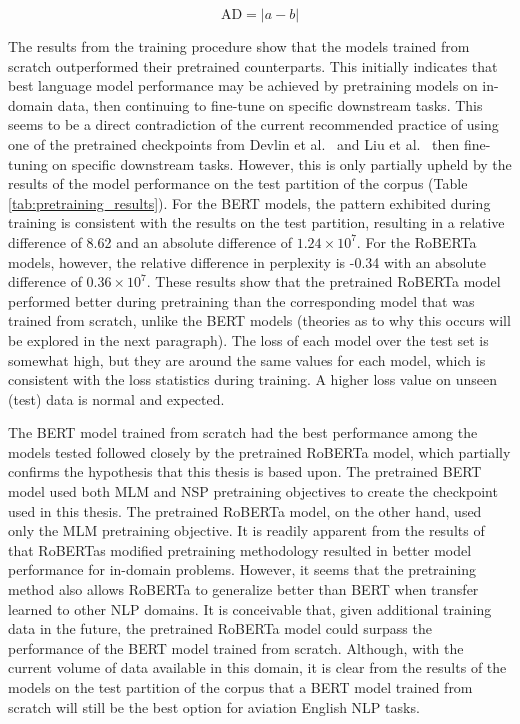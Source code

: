 \documentclass[12pt]{article}
\begin{document}
\begin{equation}\label{eq:absolute_difference}
    \mbox{AD} = |a - b|
\end{equation}

The results from the training procedure show that the models trained from scratch outperformed their pretrained counterparts. This initially
indicates that best language model performance may be achieved by pretraining models on in-domain data, then continuing to fine-tune on specific
downstream tasks. This seems to be a direct contradiction of the current recommended practice of using one of the pretrained checkpoints from Devlin
et al.~\cite{devlin_bert_2019} and Liu et al.~\cite{liu_roberta_2019} then fine-tuning on specific downstream tasks. However, this is only partially
upheld by the results of the model performance on the test partition of the corpus (Table \ref{tab:pretraining_results}). For the BERT models, the
pattern exhibited during training is consistent with the results on the test partition, resulting in a relative difference of 8.62 and an absolute
difference of $1.24 \times 10^7$. For the RoBERTa models, however, the relative difference in perplexity is -0.34 with an absolute difference of
$0.36 \times 10^7$. These results show that the pretrained RoBERTa model performed better during pretraining than the corresponding model
that was trained from scratch, unlike the BERT models (theories as to why this occurs will be explored in the next paragraph). The loss of each
model over the test set is somewhat high, but they are around the same values for each model, which is consistent with the loss statistics during
training. A higher loss value on unseen (test) data is normal and expected.

The BERT model trained from scratch had the best performance among the models tested followed closely by the pretrained RoBERTa model, which partially
confirms the hypothesis that this thesis is based upon. The pretrained BERT model used both MLM and NSP pretraining objectives to create the
checkpoint used in this thesis. The pretrained RoBERTa model, on the other hand, used only the MLM pretraining objective. It is readily apparent from
the results of \cite{liu_roberta_2019} that RoBERTas modified pretraining methodology resulted in better model performance for in-domain problems.
However, it seems that the pretraining method also allows RoBERTa to generalize better than BERT when transfer learned to other NLP domains. It is
conceivable that, given additional training data in the future, the pretrained RoBERTa model could surpass the performance of the BERT model trained
from scratch. Although, with the current volume of data available in this domain, it is clear from the results of the models on the test partition of
the corpus that a BERT model trained from scratch will still be the best option for aviation English NLP tasks.
\end{document}
